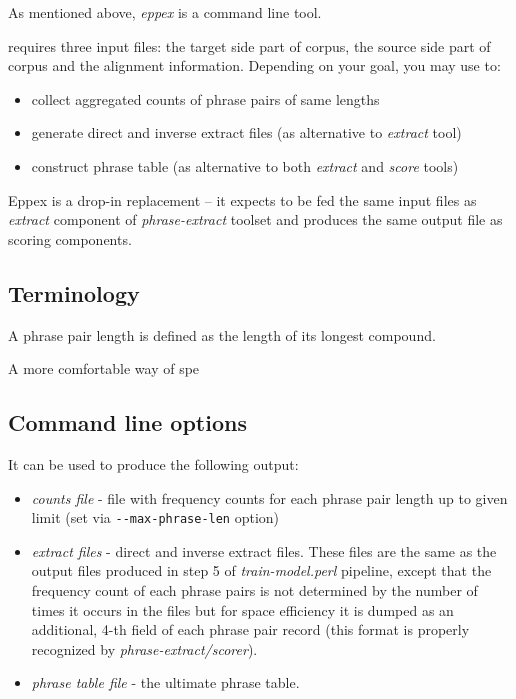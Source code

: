 As mentioned above, \emph{eppex} is a command line tool.

\Eppex{} requires three input files:
the target side part of corpus, the source side part of corpus and the alignment information.
Depending on your goal, you may use \eppex{} to:
\begin{itemize}
 \item collect aggregated counts of phrase pairs of same lengths
 \item generate direct and inverse extract files (as alternative to \emph{extract} tool)
 \item construct phrase table (as alternative to both \emph{extract} and \emph{score} tools)
\end{itemize}

Eppex is a drop-in replacement -- it expects to be fed the same input files
as \emph{extract} component of \emph{phrase-extract} toolset and produces
the same output file as scoring components.

\subsection{Terminology}


A phrase pair length is defined as the length of its longest compound.

A more comfortable way of spe

\subsection{Command line options}

It can be used to produce the following output:
\begin{itemize}
 \item \emph{counts file} - file with frequency counts for each phrase pair
  length up to given limit (set via \verb|--max-phrase-len| option)
 \item \emph{extract files} - direct and inverse extract files. These files are the
  same as the output files produced in step 5 of \emph{train-model.perl} pipeline,
  except that the frequency count of each phrase pairs is not determined by
  the number of times it occurs in the files but for space efficiency it is
  dumped as an additional, 4-th field of each phrase pair record (this format
  is properly recognized by \emph{phrase-extract/scorer}).
 \item \emph{phrase table file} - the ultimate phrase table.
\end{itemize}

